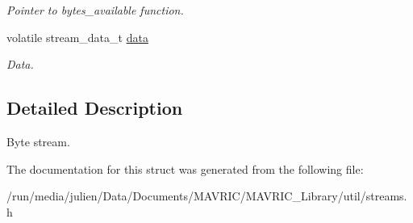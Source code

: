 \begin{DoxyCompactItemize}
\begin{DoxyCompactList}\small\item\em Pointer to bytes\+\_\+available function. \end{DoxyCompactList}\item 
\hypertarget{structbyte__stream__t_a2869ca97951516e26f6dd0b215d9d4f8}{volatile stream\+\_\+data\+\_\+t \hyperlink{structbyte__stream__t_a2869ca97951516e26f6dd0b215d9d4f8}{data}}\label{structbyte__stream__t_a2869ca97951516e26f6dd0b215d9d4f8}

\begin{DoxyCompactList}\small\item\em Data. \end{DoxyCompactList}\end{DoxyCompactItemize}


\subsection{Detailed Description}
Byte stream. 

The documentation for this struct was generated from the following file\+:\begin{DoxyCompactItemize}
\item 
/run/media/julien/\+Data/\+Documents/\+M\+A\+V\+R\+I\+C/\+M\+A\+V\+R\+I\+C\+\_\+\+Library/util/streams.\+h\end{DoxyCompactItemize}

